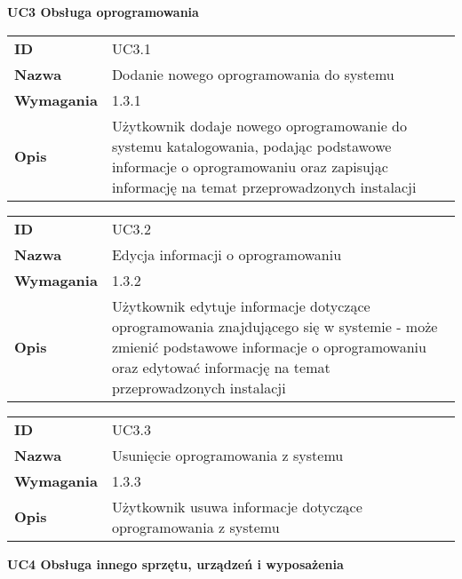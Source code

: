 \vspace{.03\textheight}
\begin{center}
  {\Large\bf UC3 Obsługa oprogramowania} \\
\end{center}
\vspace{.02\textheight}


\begin{tabular}{p{}p{}}
\hfill {\bf ID} & UC3.1 \\
\hfill {\bf Nazwa} & Dodanie nowego oprogramowania do systemu \\
\hfill {\bf Wymagania} & 1.3.1 \\
\hfill {\bf Opis} & Użytkownik dodaje nowego oprogramowanie do systemu katalogowania, podając podstawowe informacje o oprogramowaniu oraz zapisując informację na temat przeprowadzonych instalacji \\
\end{tabular}

\vspace{.05\textheight}

\begin{tabular}{p{}p{}}
\hfill {\bf ID} & UC3.2 \\
\hfill {\bf Nazwa} &  Edycja informacji o oprogramowaniu \\
\hfill {\bf Wymagania} & 1.3.2 \\
\hfill {\bf Opis} & Użytkownik edytuje informacje dotyczące oprogramowania znajdującego się w systemie - może zmienić podstawowe informacje o oprogramowaniu oraz edytować informację na temat przeprowadzonych instalacji \\
\end{tabular}

\vspace{.05\textheight}

\begin{tabular}{p{}p{}}
\hfill {\bf ID} & UC3.3 \\
\hfill {\bf Nazwa} & Usunięcie oprogramowania z systemu \\
\hfill {\bf Wymagania} & 1.3.3 \\
\hfill {\bf Opis} & Użytkownik usuwa informacje dotyczące oprogramowania z systemu \\
\end{tabular}

\vspace{.03\textheight}
\begin{center}
  {\Large\bf UC4 Obsługa innego sprzętu, urządzeń i wyposażenia } \\
\end{center}
\vspace{.02\textheight}

